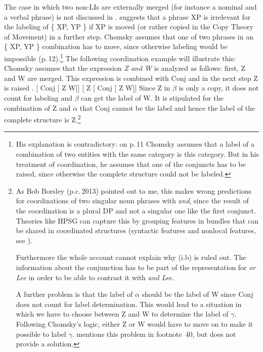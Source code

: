 The case in which two non-LIs are externally merged (for instance a nominal
and a verbal phrase) is not discussed in . \citet[--44]{Chomsky2013a}
suggests that a phrase XP is irrelevant for the labeling of \{ XP, YP \} if XP is moved (or rather
copied in the Copy Theory of Movement) in a further step. Chomsky assumes that one of two phrases in
an \{ XP, YP \} combination has to move, since otherwise labeling would be impossible (p.\,12).\footnote{\label{fn-labeling-gleiche-Kategorie}%
  His explanation is contradictory: on p.\,11 Chomsky assumes that a label of a combination of
  two entities with the same category is this category. But in his treatment of coordination, he
  assumes that one of the conjuncts has to be raised, since otherwise the complete structure could not be labeled.
}
The following coordination example will illustrate this: Chomsky assumes that the expression \emph{Z
  and W} is analyzed as follows: first, Z and W are merged. This expression is combined with Conj
   and in the next step Z is raised . 
\eal
\label{Chomsky-problems-of-projection-coordination}
\ex\label{ex-coord-a} {}[\sub{$\alpha$} Conj [\sub{$\beta$} Z W]]
\ex\label{ex-coord-b} {}[\sub{$\gamma$} Z [\sub{$\alpha$} Conj [\sub{$\beta$} Z W]]
\zl
Since Z in $\beta$ is only a copy, it does not count for labeling and $\beta$ can get the label
of W. It is stipulated for the combination of Z and $\alpha$ that Conj cannot be the label and hence
the label of the complete structure is Z.\footnote{%
    As Bob Borsley (p.c.\,2013) pointed out to me, this makes wrong predictions for coordinations of
    two singular noun phrases with \emph{and}, since the result of the coordination is a plural DP
    and not a singular one like the first conjunct. Theories like HPSG can capture this by grouping
    features in bundles that can be shared in coordinated structures (syntactic features and
    nonlocal features, see ).

Furthermore the whole account cannot explain why (i.b) is ruled out.
\eal
\zl
The information about the conjunction has to be part of the representation for \emph{or Lee} in
order to be able to contrast it with \emph{and Lee}. 

A further problem is that the label of $\alpha$ should be the label of W since Conj does not count
for label determination. This would lead to a situation in which we have to choose between Z and W
to determine the label of $\gamma$. Following Chomsky's logic, either Z or W would have to move on to
make it possible to label $\gamma$. \citet{Chomsky2013a} mentions this problem in footnote~40, but does not provide a solution.
}

